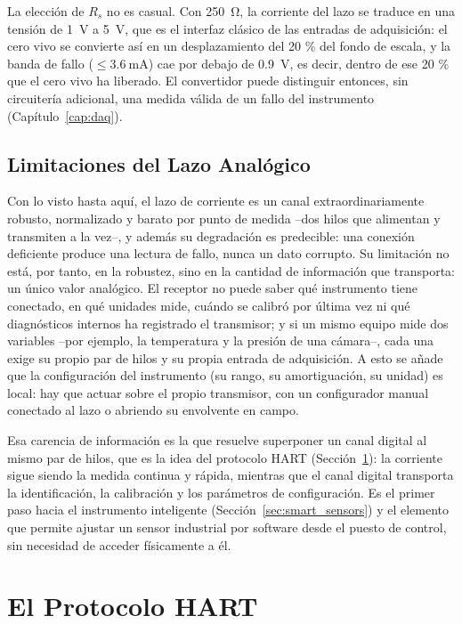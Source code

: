 La elección de $R_s$ no es casual. Con \SI{250}{\ohm}, la corriente del lazo se traduce en una tensión de \SI{1}{\volt} a \SI{5}{\volt}, que es el interfaz clásico de las entradas de adquisición: el cero vivo se convierte así en un desplazamiento del 20 \% del fondo de escala, y la banda de fallo ($\le \SI{3.6}{\milli\ampere}$) cae por debajo de \SI{0.9}{\volt}, es decir, dentro de ese 20 \% que el cero vivo ha liberado. El convertidor puede distinguir entonces, sin circuitería adicional, una medida válida de un fallo del instrumento (Capítulo~\ref{cap:daq}).

\subsection{Limitaciones del Lazo Analógico}\label{sub:limitaciones_lazo}

Con lo visto hasta aquí, el lazo de corriente es un canal extraordinariamente robusto, normalizado y barato por punto de medida --dos hilos que alimentan y transmiten a la vez--, y además su degradación es predecible: una conexión deficiente produce una lectura de fallo, nunca un dato corrupto. Su limitación no está, por tanto, en la robustez, sino en la cantidad de información que transporta: un único valor analógico. El receptor no puede saber qué instrumento tiene conectado, en qué unidades mide, cuándo se calibró por última vez ni qué diagnósticos internos ha registrado el transmisor; y si un mismo equipo mide dos variables --por ejemplo, la temperatura y la presión de una cámara--, cada una exige su propio par de hilos y su propia entrada de adquisición. A esto se añade que la configuración del instrumento (su rango, su amortiguación, su unidad) es local: hay que actuar sobre el propio transmisor, con un configurador manual conectado al lazo o abriendo su envolvente en campo.

Esa carencia de información es la que resuelve superponer un canal digital al mismo par de hilos, que es la idea del protocolo HART (Sección~\ref{sec:hart}): la corriente sigue siendo la medida continua y rápida, mientras que el canal digital transporta la identificación, la calibración y los parámetros de configuración. Es el primer paso hacia el instrumento inteligente (Sección~\ref{sec:smart_sensors}) y el elemento que permite ajustar un sensor industrial por software desde el puesto de control, sin necesidad de acceder físicamente a él.

\section{El Protocolo HART}\label{sec:hart}

